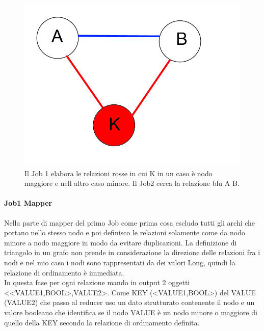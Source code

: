 \documentclass[paper=a4, fontsize=11pt]{scrartcl}	%
\numberwithin{equation}{section}															%
\numberwithin{figure}{section}																%
\numberwithin{table}{section}																%
\begin{document}
\begin{figure}[h]
\centering
        \includegraphics[totalheight=6cm]{Graph1.png}
    \caption{Il Job 1 elabora le relazioni rosse in cui K  in un caso è nodo  maggiore e nell altro caso minore. Il Job2 cerca la relazione blu A B.}
    \label{fig:verticalcell} 
\end{figure}
\paragraph{Job1 Mapper}
Nella parte di mapper del primo Job come prima cosa escludo tutti gli archi che portano nello stesso nodo e poi definisco le relazioni solamente come da nodo minore a nodo maggiore in modo da evitare duplicazioni. La definizione di triangolo in un grafo non prende in considerazione la direzione delle relazioni fra i nodi e nel mio caso i nodi sono rappresentati da dei valori Long, quindi la relazione di ordinamento è immediata.\\ 
In questa fase per ogni relazione mando in output 2 oggetti <<VALUE1,BOOL>,VALUE2>. Come KEY (<VALUE1,BOOL>) del VALUE (VALUE2) che passo al reducer uso un dato strutturato contenente il nodo e un valore booleano che identifica se il nodo VALUE è un nodo minore o maggiore di quello della KEY secondo la relazione di ordinamento definita. 
\end{document}
